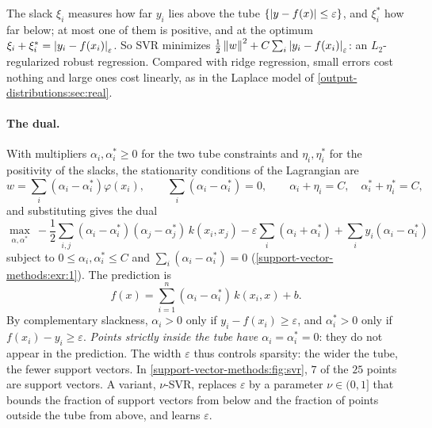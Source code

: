 \begin{notechapter}
The slack $\xi_i$ measures how far $y_i$ lies above the tube $\{\left|y - f(x)\right|\leq\varepsilon\}$, and $\xi_i^*$ how far
below; at most one of them is positive, and at the optimum $\xi_i + \xi_i^* = \left|y_i - f(x_i)\right|_\varepsilon$. So SVR
minimizes $\frac12\left\|w\right\|^2 + C\sum_i\left|y_i - f(x_i)\right|_\varepsilon$: an $L_2$-regularized robust regression. Compared with
ridge regression, small errors cost nothing and large ones cost linearly, as in the
Laplace model of \cref{output-distributions:sec:real}.

\paragraph{The dual.} With multipliers $\alpha_i, \alpha_i^*\geq0$ for the two tube constraints and
$\eta_i, \eta_i^*$ for the positivity of the slacks, the stationarity conditions of the Lagrangian
are
\[
  w = \sum_i(\alpha_i - \alpha_i^*)\varphi(x_i),\qquad\sum_i(\alpha_i - \alpha_i^*) = 0,\qquad\alpha_i + \eta_i = C,\quad\alpha_i^* + \eta_i^* = C,
\]
and substituting gives the dual
\[
  \max_{\alpha, \alpha^*}\ -\frac12\sum_{i,j}(\alpha_i - \alpha_i^*)(\alpha_j - \alpha_j^*)\,k(x_i, x_j) - \varepsilon\sum_i(\alpha_i + \alpha_i^*) + \sum_iy_i(\alpha_i - \alpha_i^*)
\]
subject to $0\leq\alpha_i, \alpha_i^*\leq C$ and $\sum_i(\alpha_i - \alpha_i^*) = 0$ (\cref{support-vector-methods:exr:1}). The prediction is
\[
  f(x) = \sum_{i=1}^n(\alpha_i - \alpha_i^*)\,k(x_i, x) + b .
\]
By complementary slackness, $\alpha_i>0$ only if $y_i - f(x_i)\geq\varepsilon$, and $\alpha_i^*>0$ only if $f(x_i) - y_i\geq\varepsilon$.
\emph{Points strictly inside the tube have $\alpha_i = \alpha_i^* = 0$}: they do not appear in the prediction.
The width $\varepsilon$ thus controls sparsity: the wider the tube, the fewer support vectors.
In \cref{support-vector-methods:fig:svr}, $7$ of the $25$ points are support vectors. A
variant, $\nu$-SVR, replaces $\varepsilon$ by a parameter $\nu\in(0, 1]$ that bounds the fraction of support
vectors from below and the fraction of points outside the tube from above, and
learns $\varepsilon$.


\end{notechapter}
